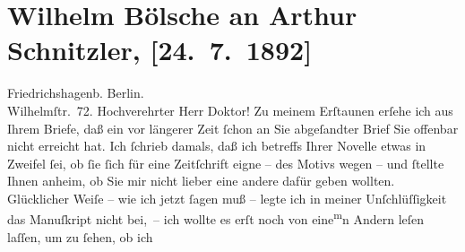 

         \renewcommand{\erwaehnteOrte}{Orte: Berlin, Friedrichshagen, Peter-Hille-Straße, Wien}
         \renewcommand{\erwaehnteWerke}{Werke: Das Himmelbett}
               \section[Wilhelm Bölsche an Arthur Schnitzler, {[}24. 7. 1892{]}]{ Wilhelm Bölsche an Arthur Schnitzler, {[}24. 7. 1892{]}}\nopagebreak{}\rehead{ }\begin{ledgroupsized}[t]{13cm}\normalsize\beginnumbering \toendnotes[C]{\smallbreak\pagebreak[2]} 
\toendnotes[C]{\smallbreak}\pstart
           \raggedleft{}{\pb}Friedrichshagenb. Berlin.{\\}Wilhelmſtr. 72.\pend
           \pstart\center{}Hochverehrter Herr Doktor!\pend\pstart
           Zu meinem Erſtaunen erſehe ich aus Ihrem Briefe, daß ein vor längerer Zeit ſchon an
               Sie abgeſandter Brief Sie offenbar nicht erreicht hat. Ich ſchrieb damals, daß ich
               betreffs Ihrer Novelle etwas
                  \introOben{}in\introOben{} Zweifel ſei, ob ſie ſich für eine Zeitſchrift eigne –
               des Motivs wegen – und ſtellte Ihnen anheim, ob Sie mir nicht lieber eine andere
               dafür geben wollten. Glücklicher Weiſe – wie ich jetzt ſagen muß – legte ich in {\pb}meiner Unſchlüſſigkeit das Manuſkript nicht bei, – ich
               wollte es erſt noch von eine\substVorne{}\textsuperscript{m}\substDazwischen{}n\substHinten{} Andern leſen laſſen, um  zu ſehen, ob ich

\end{ledgroupsized}
